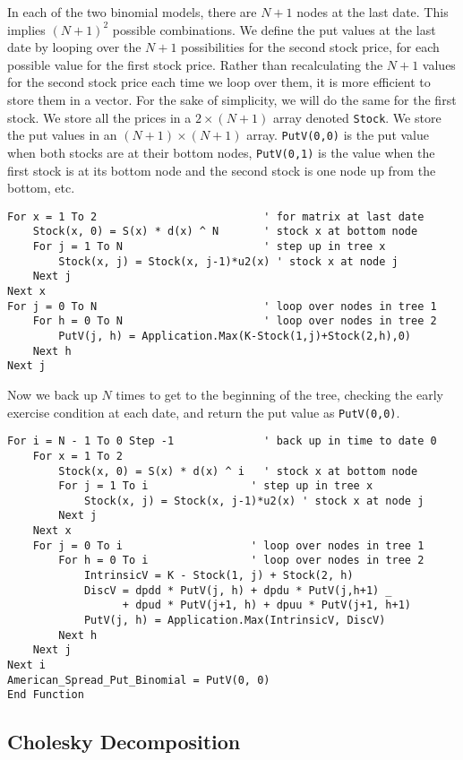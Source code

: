 In each of the two binomial models, there are $N+1$ nodes at the last date.  This implies $(N+1)^2$ possible combinations.  We define the put values at the last date by looping over the $N+1$ possibilities for the second stock price, for each possible value for the first stock price.  Rather than recalculating the $N+1$ values for the second stock price each time we loop over them, it is more efficient to store them in a vector.  For the sake of simplicity, we will do the same for the first stock.  We store all the prices in a $2 \times (N\!+\!1)$ array denoted \verb!Stock!.  We store the put values in an $(N\!+\!1) \times (N\!+\!1)$ array.  \verb!PutV(0,0)! is the put value when both stocks are at their bottom nodes, \verb!PutV(0,1)! is the value when the first stock is at its bottom node and the second stock is one  node up from the bottom, etc.
\small\begin{verbatim}
For x = 1 To 2                          ' for matrix at last date
    Stock(x, 0) = S(x) * d(x) ^ N       ' stock x at bottom node
    For j = 1 To N                      ' step up in tree x 
        Stock(x, j) = Stock(x, j-1)*u2(x) ' stock x at node j 
    Next j
Next x
For j = 0 To N                          ' loop over nodes in tree 1 
    For h = 0 To N                      ' loop over nodes in tree 2 
        PutV(j, h) = Application.Max(K-Stock(1,j)+Stock(2,h),0)
    Next h
Next j
\end{verbatim}\normalsize
Now we back up $N$ times to get to the beginning of the tree, checking the early exercise condition at each date, and return the put value as \verb!PutV(0,0)!.
\small\begin{verbatim}
For i = N - 1 To 0 Step -1              ' back up in time to date 0
    For x = 1 To 2
        Stock(x, 0) = S(x) * d(x) ^ i   ' stock x at bottom node
        For j = 1 To i                ' step up in tree x
            Stock(x, j) = Stock(x, j-1)*u2(x) ' stock x at node j
        Next j
    Next x
    For j = 0 To i                    ' loop over nodes in tree 1
        For h = 0 To i                ' loop over nodes in tree 2
            IntrinsicV = K - Stock(1, j) + Stock(2, h)
            DiscV = dpdd * PutV(j, h) + dpdu * PutV(j,h+1) _
                  + dpud * PutV(j+1, h) + dpuu * PutV(j+1, h+1)
            PutV(j, h) = Application.Max(IntrinsicV, DiscV)
        Next h
    Next j
Next i
American_Spread_Put_Binomial = PutV(0, 0)
End Function
\end{verbatim}\normalsize

\subsection*{Cholesky Decomposition}

